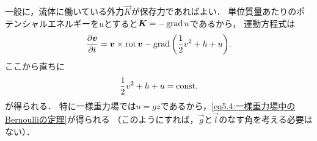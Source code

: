 \begin{details}
一般に，流体に働いている外力$\vec{K}$が保存力であればよい．
単位質量あたりのポテンシャルエネルギーを$u$とすると$\vb*{K}=-\operatorname{grad} u$であるから，
運動方程式は
\[
    \pdv{\v}{t} = \v \times \Rot \v - \Grad\pqty{\frac{1}{2}v^2+h+u}.
\]
ここから直ちに
\[
    \frac{1}{2}v^2+h+u=\mathrm{const.}
\]
が得られる．
特に一様重力場では$u=gz$であるから，\eqref{eq5.4:一様重力場中のBernoulliの定理}が得られる
（このようにすれば，$\vec{g}$と$\vec{l}$のなす角を考える必要はない）．
\end{details}




\BackToTheToc